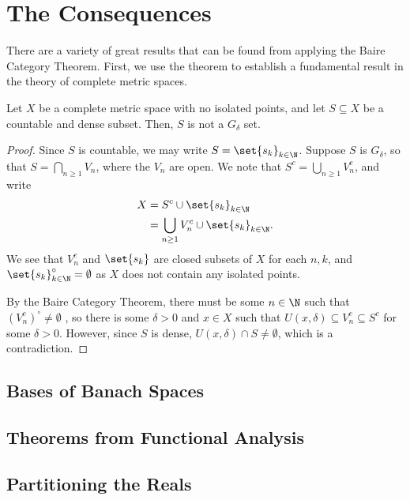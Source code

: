 \documentclass[10pt]{mypackage}
\begin{document}
\section{The Consequences}%
There are a variety of great results that can be found from applying the Baire Category Theorem. First, we use the theorem to establish a fundamental result in the theory of complete metric spaces.
\begin{proposition}
  Let $X$ be a complete metric space with no isolated points, and let $S\subseteq X$ be a countable and dense subset. Then, $S$ is not a $G_{\delta}$ set.
\end{proposition}
\begin{proof}
  Since $S$ is countable, we may write $S = \set{s_k}_{k\in\N}$. Suppose $S$ is $G_{\delta}$, so that $S = \bigcap_{n\geq 1} V_n$, where the $V_n$ are open. We note that $S^{c} = \bigcup_{n\geq 1}V_n^{c}$, and write
  \begin{align*}
    X &= S^{c} \cup \set{s_k}_{k\in\N}\\
      &= \bigcup_{n\geq 1}V_n^{c} \cup \set{s_k}_{k\in\N}.
  \end{align*}
  We see that $V_n^{c}$ and $\set{s_k}$ are closed subsets of $X$ for each $n,k$, and $\set{s_k}_{k\in\N}^{\circ} = \emptyset$ as $X$ does not contain any isolated points.\newline

  By the Baire Category Theorem, there must be some $n\in\N$ such that $\left( V_n^{c} \right)^{\circ}\neq \emptyset$ , so there is some $\delta > 0$ and $x\in X$ such that $U\left( x,\delta \right)\subseteq V_n^{c}\subseteq S^{c}$ for some $\delta > 0$. However, since $S$ is dense, $U\left( x,\delta \right)\cap S \neq \emptyset$, which is a contradiction.
\end{proof}
\subsection{Bases of Banach Spaces}%
\subsection{Theorems from Functional Analysis}%
\subsection{Partitioning the Reals}%
\end{document}
